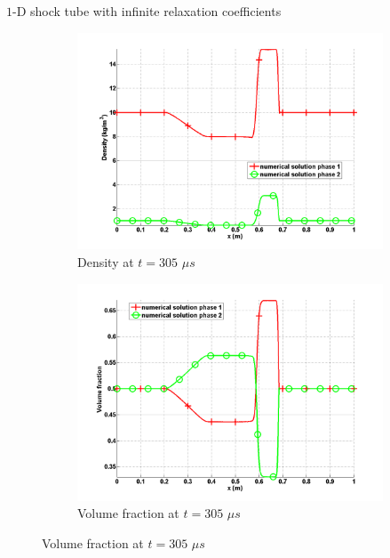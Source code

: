 \documentclass[xcolor=dvipsnames,10pt]{beamer}
\begin{document}
\begin{frame}{$1$-D shock tube with infinite relaxation coefficients}
\begin{figure}
        \begin{subfigure}[b]{0.37\textwidth}
                \centering
                \includegraphics[width=\textwidth]{../figures/SEM/relaxation_two_phases_density.png}
                \caption{Density at $t=305$ $\mu s$}
        \end{subfigure}%
        \begin{subfigure}[b]{0.37\textwidth}
                \centering
                \includegraphics[width=\textwidth]{../figures/SEM/relaxation_two_phases_volume_fraction.png}
                \caption{Volume fraction at $t=305$ $\mu s$}
        \end{subfigure}%
\end{figure}
\end{frame}
\end{document}
